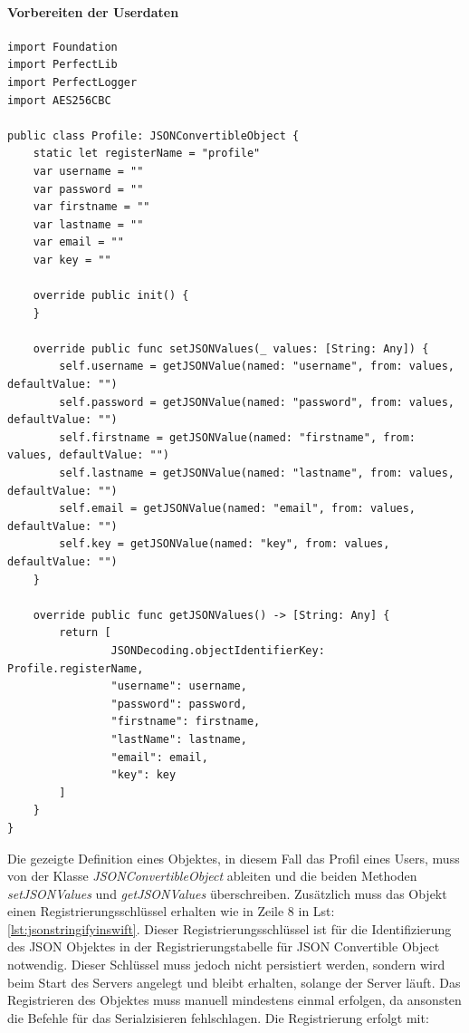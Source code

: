 \paragraph{Vorbereiten der Userdaten}

\begin{lstlisting}
import Foundation
import PerfectLib
import PerfectLogger
import AES256CBC

public class Profile: JSONConvertibleObject {
    static let registerName = "profile"
    var username = ""
    var password = ""
    var firstname = ""
    var lastname = ""
    var email = ""
    var key = ""

    override public init() {
    }

    override public func setJSONValues(_ values: [String: Any]) {
        self.username = getJSONValue(named: "username", from: values, defaultValue: "")
        self.password = getJSONValue(named: "password", from: values, defaultValue: "")
        self.firstname = getJSONValue(named: "firstname", from: values, defaultValue: "")
        self.lastname = getJSONValue(named: "lastname", from: values, defaultValue: "")
        self.email = getJSONValue(named: "email", from: values, defaultValue: "")
        self.key = getJSONValue(named: "key", from: values, defaultValue: "")
    }

    override public func getJSONValues() -> [String: Any] {
        return [
                JSONDecoding.objectIdentifierKey: Profile.registerName,
                "username": username,
                "password": password,
                "firstname": firstname,
                "lastName": lastname,
                "email": email,
                "key": key
        ]
    }
}
\end{lstlisting}

Die gezeigte Definition eines Objektes, in diesem Fall das Profil eines Users, muss von der Klasse \textit{JSONConvertibleObject} ableiten und die beiden Methoden \textit{setJSONValues} und \textit{getJSONValues} überschreiben. Zusätzlich muss das Objekt einen Registrierungsschlüssel erhalten wie in Zeile 8 in Lst:  \ref{lst:jsonstringifyinswift}. Dieser Registrierungsschlüssel ist für die Identifizierung des JSON Objektes in der Registrierungstabelle für JSON Convertible Object notwendig. Dieser Schlüssel muss jedoch nicht persistiert werden, sondern wird beim Start des Servers angelegt und bleibt erhalten, solange der Server läuft. Das Registrieren des Objektes muss manuell mindestens einmal erfolgen, da ansonsten die Befehle für das Serialzisieren fehlschlagen. Die Registrierung erfolgt mit:

